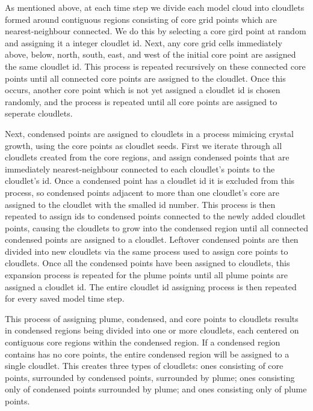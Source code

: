 \documentclass[acp]{copernicus}
\begin{document}
As mentioned above, at each time step we divide each model cloud into cloudlets 
formed around contiguous regions consisting of core grid points which are 
nearest-neighbour connected.  We do this by selecting a core gird point at 
random and assigning it a integer cloudlet id. Next, any core grid cells 
immediately above, below, north, south, east, and west of the initial core 
point are assigned the same cloudlet id.  This process is repeated recursively 
on these connected core points until all connected core points are assigned to 
the cloudlet.  Once this occurs, another core point which is not yet assigned a 
cloudlet id is chosen randomly, and the process is repeated until all core 
points are assigned to seperate cloudlets.

Next, condensed points are assigned to cloudlets in a process mimicing crystal 
growth, using the core points as cloudlet seeds. First we iterate through all
cloudlets created from the core regions, and assign condensed points that are
immediately nearest-neighbour connected to each cloudlet's points to the
cloudlet's id. Once a condensed point has a cloudlet id it is excluded from 
this process, so condensed points adjacent to more than one cloudlet's core are 
assigned to the cloudlet with the smalled id number.  This process is then 
repeated to assign ids to condensed points connected to the newly added 
cloudlet points, causing the cloudlets to grow into the condensed region until 
all connected condensed points are assigned to a cloudlet.  Leftover condensed 
points are then divided into new cloudlets via the same process used to assign 
core points to cloudlets.  Once all the condensed points have been assigned to
cloudlets, this expansion process is repeated for the plume points until all 
plume points are assigned a cloudlet id.  The entire cloudlet id assigning 
process is then repeated for every saved model time step.

This process of assigning plume, condensed, and core points to cloudlets 
results in condensed regions being divided into one or more cloudlets, each 
centered on contiguous core regions within the condensed region.  If a 
condensed region contains has no core points, the entire condensed region will 
be assigned to a single cloudlet.  This creates three types of cloudlets: ones
consisting of core points, surrounded by condensed points, surrounded by plume; 
ones consisting only of condensed points surrounded by plume; and ones 
consisting only of plume points. 
\end{document}
